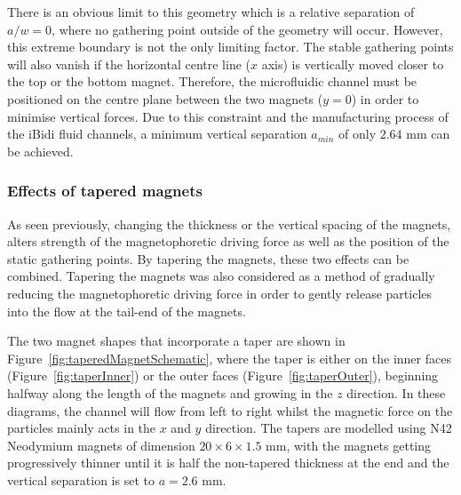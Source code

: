 There is an obvious limit to this geometry which is a relative separation of $a/w=0$, where no gathering point outside of the geometry will occur. However, this extreme boundary is not the only limiting factor. The stable gathering points will also vanish if the horizontal centre line ($x$ axis) is vertically moved closer to the top or the bottom magnet. Therefore, the microfluidic channel must be positioned on the centre plane between the two magnets ($y=0$) in order to minimise vertical forces. Due to this constraint and the manufacturing process of the iBidi fluid channels, a minimum vertical separation $a_{min}$ of only $2.64$ mm can be achieved. 

\subsubsection{Effects of tapered magnets}\label{subsubsec:effectsOfTaperedMagnets}
As seen previously, changing the thickness or the vertical spacing of the magnets, alters strength of the magnetophoretic driving force as well as the position of the static gathering points. By tapering the magnets, these two effects can be combined. Tapering the magnets was also considered as a method of gradually reducing the magnetophoretic driving force in order to gently release particles into the flow at the tail-end of the magnets.

The two magnet shapes that incorporate a taper are shown in Figure~\ref{fig:taperedMagnetSchematic}, where the taper is either on the inner faces (Figure~\ref{fig:taperInner}) or the outer faces (Figure~\ref{fig:taperOuter}), beginning halfway along the length of the magnets and growing in the $z$ direction. In these diagrams, the channel will flow from left to right whilst the magnetic force on the particles mainly acts in the $x$ and $y$ direction. The tapers are modelled using N42 Neodymium magnets of dimension $20\times 6\times 1.5$ mm, with the magnets getting progressively thinner until it is half the non-tapered thickness at the end and the vertical separation is set to $a=2.6$ mm.  

